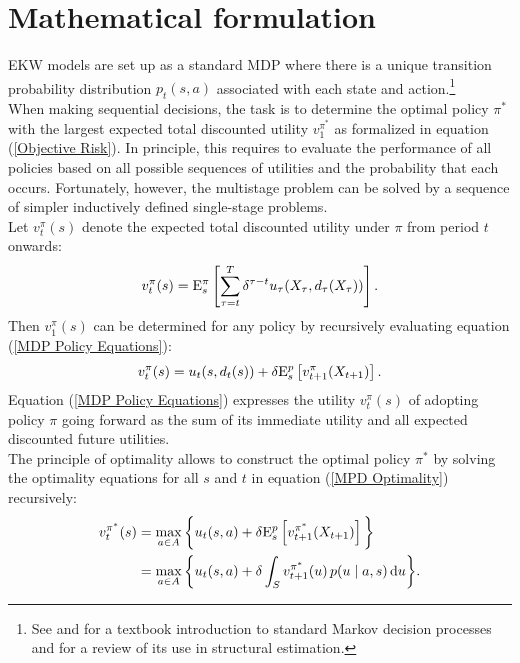 \section{Mathematical formulation}\label{Mathematics}
EKW models are set up as a standard MDP where there is a unique transition probability distribution $p_t(s, a)$ associated with each state and action.\footnote{See \citet{Puterman.1994} and \citet{White.1993} for a textbook introduction to standard Markov decision processes and \citet{Rust.1994} for a review of its use in structural estimation.}\\

When making sequential decisions, the task is to determine the optimal policy $\pi^*$ with the largest expected total discounted utility $v^{\pi^*}_1$ as formalized in equation (\ref{Objective Risk}). In principle, this requires to evaluate the performance of all policies based on all possible sequences of utilities and the probability that each occurs. Fortunately, however, the multistage problem can be solved by a sequence of simpler inductively defined single-stage problems.\\

Let $v^\pi_t(s)$ denote the expected total discounted utility under $\pi$ from period $t$ onwards:
%
\begin{align*}
v^\pi_t(s) = \mathrm{E}^\pi_{s}\left[ \sum^T_{\tau=t} \delta^{\tau - t}   u_\tau(X_\tau, d_\tau(X_\tau)) \right].
\end{align*}
%
Then $v_1^\pi(s)$ can be determined for any policy by recursively evaluating equation (\ref{MDP Policy Equations}):
%
\begin{align}\label{MDP Policy Equations}
v^\pi_t(s) = u_t(s, d_t(s)) + \delta\mathrm{E}^p_{s} \left[v^\pi_{t + 1}(X_{t + 1})\right].
\end{align}
%
Equation (\ref{MDP Policy Equations}) expresses the utility $v^\pi_t(s)$ of adopting policy $\pi$ going forward as the sum of its immediate utility and all expected discounted future utilities.\\

The principle of optimality \citep{Bellman.1957, Puterman.1994} allows to construct the optimal policy $\pi^*$ by solving the optimality equations for all $s$ and $t$ in equation (\ref{MPD Optimality}) recursively:
%
\begin{align}\label{MPD Optimality}
v^{\pi^*}_t(s)  & = \max_{a \in A}\bigg\{ u_t(s, a) + \delta \mathrm{E}^p_{s} \left[v^{\pi^*}_{t + 1}(X_{t + 1})\right] \bigg\} \\
                & = \max_{a \in A}\bigg\{ u_t(s, a) + \delta \int_S v^{\pi^*}_{t + 1}(u)\, p(u\mid a, s) \mathop{}\!\mathrm{d} u\bigg\}.
\end{align}

